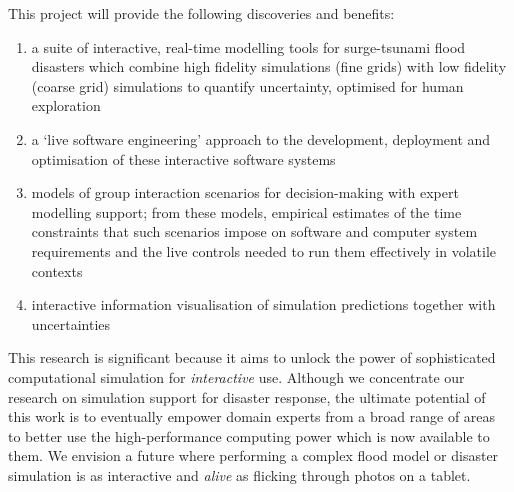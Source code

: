 \medskip
This project will provide the following discoveries and benefits:
\begin{enumerate}

\item a suite of interactive, real-time modelling tools for
  surge-tsunami flood disasters which combine high fidelity
  simulations (fine grids) with low fidelity (coarse grid) simulations
  to quantify uncertainty, optimised for human exploration

\item a `live software engineering' approach to the development,
  deployment and optimisation of these interactive software systems

\item models of group interaction scenarios for decision-making with
  expert modelling support; from these models, empirical estimates of
  the time constraints that such scenarios impose on software
  and computer system requirements and the live controls needed to run
  them effectively in volatile contexts

\item interactive information visualisation of simulation predictions
together with uncertainties
 

\end{enumerate}

This research is significant because it aims to unlock the power of
sophisticated computational simulation for \emph{interactive} use.
Although we concentrate our research on simulation support for
disaster response, the ultimate potential of this work is to
eventually empower domain experts from a broad range of areas to
better use the high-performance computing power which is now available
to them. We envision a future where performing a complex flood model
or disaster simulation is as interactive and \emph{alive} as flicking
through photos on a tablet.

